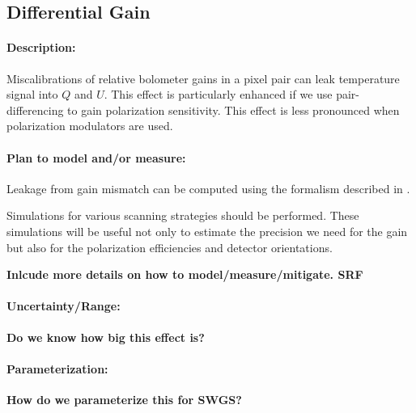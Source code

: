 \subsection{Differential Gain}

\paragraph{Description:}
Miscalibrations of relative bolometer gains in a pixel pair can leak temperature signal into $Q$ and $U$. This effect is particularly enhanced if we use pair-differencing to gain polarization sensitivity. This effect is less pronounced when polarization modulators are used.

\paragraph{Plan to model and/or measure:}
Leakage from gain mismatch can be computed using the formalism described in \cite{rosset2010}.

Simulations for various scanning strategies should be performed. These simulations will be useful not only to estimate the precision we need for the gain but also for the polarization efficiencies and detector orientations.


\textbf{Inlcude more details on how to model/measure/mitigate. SRF}

\paragraph{Uncertainty/Range:}

\textbf{Do we know how big this effect is?}

\paragraph{Parameterization:}
\textbf{How do we parameterize this for SWGS?}
